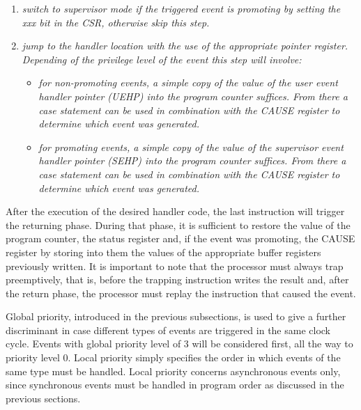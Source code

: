\begin{enumerate}
            \item \textit{switch to supervisor mode if the triggered event is promoting by setting the xxx bit in the CSR, otherwise skip this step.}

            \item \textit{jump to the handler location with the use of the appropriate pointer register. Depending of the privilege level of the event this step will involve:}

                \begin{itemize}

                    \item \textit{for non-promoting events, a simple copy of the value of the user event handler pointer (UEHP) into the program counter suffices. From there a case statement can be used in combination with the CAUSE register to determine which event was generated.}

                    \item \textit{for promoting events, a simple copy of the value of the supervisor event handler pointer (SEHP) into the program counter suffices. From there a case statement can be used in combination with the CAUSE register to determine which event was generated.}

                \end{itemize}

        \end{enumerate}

        After the execution of the desired handler code, the last instruction will trigger the returning phase. During that phase, it is sufficient to restore the value of the program counter, the status register and, if the event was promoting, the CAUSE register by storing into them the values of the appropriate buffer registers previously written. It is important to note that the processor must always trap preemptively, that is, before the trapping instruction writes the result and, after the return phase, the processor must replay the instruction that caused the event.

        \vspace{10pt} 

        Global priority, introduced in the previous subsections, is used to give a further discriminant in case different types of events are triggered in the same clock cycle. Events with global priority level of 3 will be considered first, all the way to priority level 0. Local priority simply specifies the order in which events of the same type must be handled. Local priority concerns asynchronous events only, since synchronous events must be handled in program order as discussed in the previous sections.

